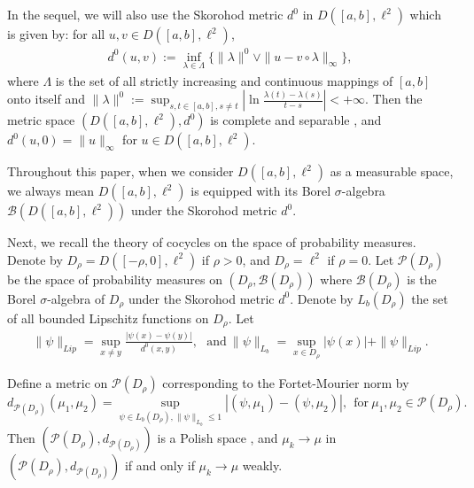 \documentclass[11pt]{article}
\numberwithin{equation}{section}
\theoremstyle{plain}
\begin{document}
 
 In the sequel, 
 we will also use the Skorohod metric $ d^0 $ in $D([a,b], \ell^2)$ which is given by:
 for all $ u,v \in D([a,b], \ell^2)$,   
 \begin{align*}
       d^0(u,v) := \inf_{\lambda \in \Lambda}
                               \{ \|\lambda\|^0 \vee \| u - v \circ \lambda \|_{ \infty } \},
 \end{align*}
 where $ \Lambda $  is the set of all strictly increasing and continuous mappings of $[a,b]$ onto itself
 and $ \|\lambda\|^0 := \sup_{s,t \in [a,b], s \neq t}
                                  \left| \ln \frac{\lambda(t)-\lambda(s)}{t-s} \right| < +\infty $.
 Then the metric space $( D([a,b], \ell^2), d^0)$ is complete and separable \cite{B2023BOOK},
 and $d^0(u,0) = \|u\|_{\infty }$
 for $u\in  D([a,b], \ell^2) $.
 
 Throughout this paper, 
 when we  consider  
 $  D([a,b], \ell^2) $ as a measurable space,
 we always mean  
 $  D([a,b], \ell^2) $ is equipped with its  
  Borel $\sigma$-algebra
 $\mathscr{B}( D([a,b], \ell^2))$   under the Skorohod metric $ d^0 $.

 Next, we recall the theory of cocycles on the space of probability measures.
 Denote by $ D_{\rho} = D([-\rho,0], \ell^2) $ if $ \rho > 0 $, and $ D_{\rho}= \ell^2 $ if $ \rho = 0 $.
 Let
  $ \mathcal{P}(D_{\rho})$ be 
  the space of probability measures on $\left( D_{\rho}, \mathscr{B}(D_{\rho}) \right)$   
 where $\mathscr{B}(D_{\rho})$ is the Borel $\sigma$-algebra of $ D_{\rho} $ under the Skorohod metric $ d^0 $.
 Denote by $L_b(D_{\rho})$ the set of all bounded Lipschitz functions on $D_{\rho}$.
 Let
\begin{align*}
   \|\psi\|_{Lip} = \sup_{x \neq y}
                       \frac{| \psi(x) - \psi(y)|}{d^0(x,y)}, \ \ \
   \text{and}\
   \|\psi\|_{L_b} = \sup_{ x \in D_{\rho}} |\psi(x)| + \|\psi\|_{Lip}.
\end{align*}

 Define a metric on $ \mathcal{P}(D_{\rho}) $ corresponding to the Fortet-Mourier norm by
 $$ d_{\mathcal{P}(D_{\rho})} (\mu_1, \mu_2)
    = \sup_{\psi \in L_b(D_{\rho}), \|\psi\|_{L_b} \le 1}
        \left| ( \psi, \mu_1 ) - ( \psi, \mu_2 ) \right|, \ \  \text{for}\  \mu_1, \mu_2 \in \mathcal{P}(D_{\rho}).$$
 Then $\left( \mathcal{P}(D_{\rho}), d_{ \mathcal{P}( D_{\rho}) } \right)$ is a Polish space \cite{AJ2023},
 and $\mu_k \to \mu$ in $\left( \mathcal{P}(D_{\rho}), d_{ \mathcal{P}( D_{\rho}) } \right)$ if and only if $\mu_k \to \mu$ weakly.
\end{document}
